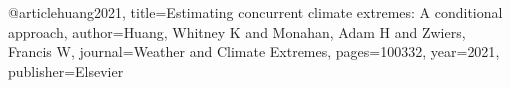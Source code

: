 @article{huang2021,
  title={Estimating concurrent climate extremes: A conditional approach},
  author={Huang, Whitney K and Monahan, Adam H and Zwiers, Francis W},
  journal={Weather and Climate Extremes},
  pages={100332},
  year={2021},
  publisher={Elsevier}
}